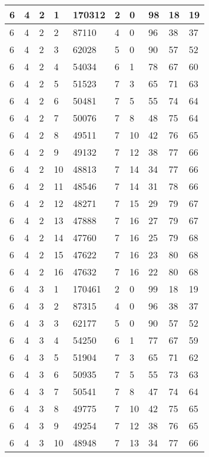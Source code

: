 \begin{table}[!ht]
\begin{tabular}{|l|l|l|l|l|l|l|l|l|l|}
        6 & 4 & 2 & 1 & 170312 & 2 & 0 & 98 & 18 & 19 \\ \hline
        6 & 4 & 2 & 2 & 87110 & 4 & 0 & 96 & 38 & 37 \\ \hline
        6 & 4 & 2 & 3 & 62028 & 5 & 0 & 90 & 57 & 52 \\ \hline
        6 & 4 & 2 & 4 & 54034 & 6 & 1 & 78 & 67 & 60 \\ \hline
        6 & 4 & 2 & 5 & 51523 & 7 & 3 & 65 & 71 & 63 \\ \hline
        6 & 4 & 2 & 6 & 50481 & 7 & 5 & 55 & 74 & 64 \\ \hline
        6 & 4 & 2 & 7 & 50076 & 7 & 8 & 48 & 75 & 64 \\ \hline
        6 & 4 & 2 & 8 & 49511 & 7 & 10 & 42 & 76 & 65 \\ \hline
        6 & 4 & 2 & 9 & 49132 & 7 & 12 & 38 & 77 & 66 \\ \hline
        6 & 4 & 2 & 10 & 48813 & 7 & 14 & 34 & 77 & 66 \\ \hline
        6 & 4 & 2 & 11 & 48546 & 7 & 14 & 31 & 78 & 66 \\ \hline
        6 & 4 & 2 & 12 & 48271 & 7 & 15 & 29 & 79 & 67 \\ \hline
        6 & 4 & 2 & 13 & 47888 & 7 & 16 & 27 & 79 & 67 \\ \hline
        6 & 4 & 2 & 14 & 47760 & 7 & 16 & 25 & 79 & 68 \\ \hline
        6 & 4 & 2 & 15 & 47622 & 7 & 16 & 23 & 80 & 68 \\ \hline
        6 & 4 & 2 & 16 & 47632 & 7 & 16 & 22 & 80 & 68 \\ \hline
        6 & 4 & 3 & 1 & 170461 & 2 & 0 & 99 & 18 & 19 \\ \hline
        6 & 4 & 3 & 2 & 87315 & 4 & 0 & 96 & 38 & 37 \\ \hline
        6 & 4 & 3 & 3 & 62177 & 5 & 0 & 90 & 57 & 52 \\ \hline
        6 & 4 & 3 & 4 & 54250 & 6 & 1 & 77 & 67 & 59 \\ \hline
        6 & 4 & 3 & 5 & 51904 & 7 & 3 & 65 & 71 & 62 \\ \hline
        6 & 4 & 3 & 6 & 50935 & 7 & 5 & 55 & 73 & 63 \\ \hline
        6 & 4 & 3 & 7 & 50541 & 7 & 8 & 47 & 74 & 64 \\ \hline
        6 & 4 & 3 & 8 & 49775 & 7 & 10 & 42 & 75 & 65 \\ \hline
        6 & 4 & 3 & 9 & 49254 & 7 & 12 & 38 & 76 & 65 \\ \hline
        6 & 4 & 3 & 10 & 48948 & 7 & 13 & 34 & 77 & 66 \\ \hline

\end{tabular}
\end{table}
